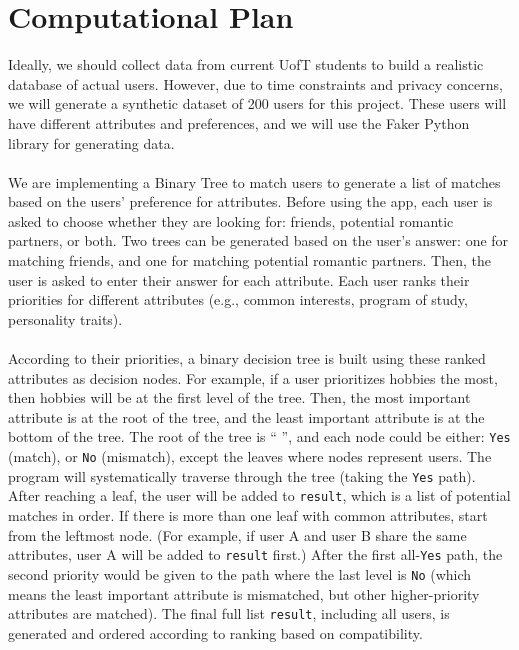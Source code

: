\documentclass[fontsize=11pt]{article}
\begin{document}
\section*{Computational Plan}

Ideally, we should collect data from current UofT students to build a realistic database of actual users.
However, due to time constraints and privacy concerns, we will generate a synthetic dataset of 200 users for this project.
These users will have different attributes and preferences, and we will use the Faker Python library for generating data.
\\
\\
We are implementing a Binary Tree to match users to generate a list of matches based on the users’ preference for attributes.
Before using the app, each user is asked to choose whether they are looking for: friends, potential romantic partners, or both.
Two trees can be generated based on the user’s answer: one for matching friends, and one for matching potential romantic partners.
Then, the user is asked to enter their answer for each attribute.
Each user ranks their priorities for different attributes (e.g., common interests, program of study, personality traits).
\\
\\
According to their priorities, a binary decision tree is built using these ranked attributes as decision nodes.
For example, if a user prioritizes hobbies the most, then hobbies will be at the first level of the tree.
Then, the most important attribute is at the root of the tree, and the least important attribute is at the bottom of the tree.
The root of the tree is “ ”, and each node could be either: \texttt{Yes} (match), or \texttt{No} (mismatch), except the leaves where nodes represent users.
The program will systematically traverse through the tree (taking the \texttt{Yes} path).
After reaching a leaf, the user will be added to \texttt{result}, which is a list of potential matches in order.
If there is more than one leaf with common attributes, start from the leftmost node.
(For example, if user A and user B share the same attributes, user A will be added to \texttt{result} first.)
After the first all-\texttt{Yes} path, the second priority would be given to the path where the last level is \texttt{No}
(which means the least important attribute is mismatched, but other higher-priority attributes are matched).
The final full list \texttt{result}, including all users, is generated and ordered according to ranking based on compatibility.
\\
\end{document}
